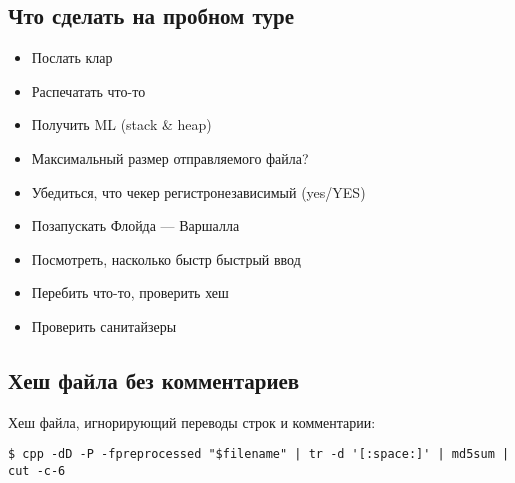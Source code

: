 \subsection{Что сделать на пробном туре}
\begin{itemize}
\item Послать клар
\item Распечатать что-то
\item Получить ML (stack \& heap)
\item Максимальный размер отправляемого файла?
\item Убедиться, что чекер регистронезависимый (yes/YES)
\item Позапускать Флойда --- Варшалла
\item Посмотреть, насколько быстр быстрый ввод
\item Перебить что-то, проверить хеш
\item Проверить санитайзеры
\end{itemize}
\subsection{Хеш файла без комментариев}
Хеш файла, игнорирующий переводы строк и комментарии:
\begin{lstlisting}
$ cpp -dD -P -fpreprocessed "$filename" | tr -d '[:space:]' | md5sum | cut -c-6
\end{lstlisting}
